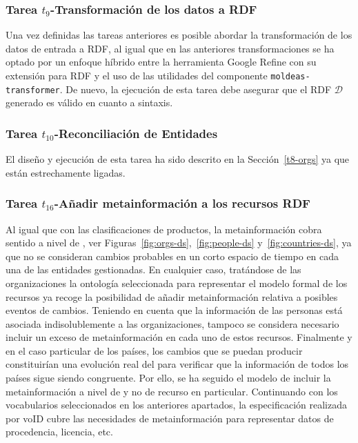 \subsubsection{Tarea $t_9$-Transformación de los datos a RDF}
Una vez definidas las tareas anteriores es posible abordar la transformación 
de los datos de entrada a \gls{RDF}, al igual que en las anteriores transformaciones 
se ha optado por un enfoque híbrido entre la herramienta Google Refine con su extensión 
para RDF y el uso de las utilidades del componente \texttt{moldeas-transformer}. De nuevo, la ejecución de esta 
tarea debe asegurar que el \dataset RDF $\mathcal{D}$ generado es válido en cuanto a sintaxis. 


\subsubsection{Tarea $t_{10}$-Reconciliación de Entidades}
El diseño y ejecución de esta tarea ha sido descrito en la Sección~\ref{t8-orgs} ya que están 
estrechamente ligadas.

\subsubsection{Tarea $t_{16}$-Añadir metainformación a los recursos RDF}\label{t16-orgs}
Al igual que con las clasificaciones de productos, la metainformación cobra sentido a 
nivel de \dataset, ver Figuras~\ref{fig:orgs-ds},~\ref{fig:people-ds} y~\ref{fig:countries-ds}, ya que no se consideran cambios probables en un corto espacio de tiempo 
en cada una de las entidades gestionadas. En cualquier caso, tratándose de las organizaciones 
la ontología seleccionada para representar el modelo formal de los recursos ya recoge 
la posibilidad de añadir metainformación relativa a posibles eventos de cambios. Teniendo 
en cuenta que la información de las personas está asociada indisolublemente a las organizaciones, tampoco se considera necesario incluir un exceso de metainformación 
en cada uno de estos recursos. Finalmente y en el caso particular de los países, los cambios que se puedan 
producir constituirían una evolución real del \dataset para verificar que la información de todos los países 
sigue siendo congruente. Por ello, se ha seguido el modelo de incluir la metainformación a nivel de 
\dataset y no de recurso en particular. Continuando con los vocabularios seleccionados en los anteriores 
apartados, la especificación realizada por \gls{voID} cubre las necesidades de metainformación para representar 
datos de procedencia, licencia, etc.

